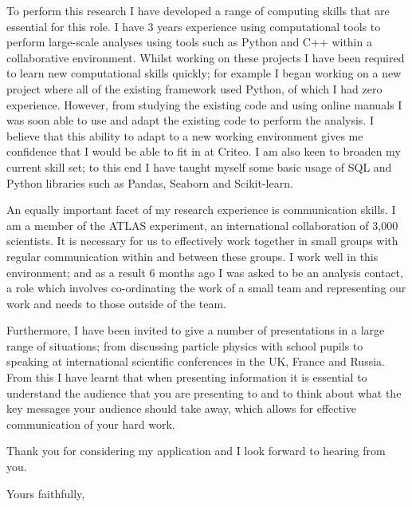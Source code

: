 \documentclass[]{letter}
\begin{document}
\begin{letter}{}
To perform this research I have developed a range of computing skills that are essential for this role.
I have 3 years experience using computational tools to perform large-scale analyses using tools such as
Python and C++ within a collaborative environment.
Whilst working on these projects I have been required to learn new computational skills quickly;
for example I began working on a new project where all of the existing framework used Python,
of which I had zero experience.
However, from studying the existing code and using online manuals
I was soon able to use and adapt the existing code to perform the analysis.
I believe that this ability to adapt to a new working environment gives me confidence that I would be able to fit in at Criteo.
I am also keen to broaden my current skill set;
to this end I have taught myself some basic usage of SQL and Python libraries such as Pandas, Seaborn and Scikit-learn.


An equally important facet of my research experience is communication skills.
I am a member of the ATLAS experiment, an international collaboration of 3,000 scientists.
It is necessary for us to effectively work together in small groups
with regular communication within and between these groups.
I work well in this environment;
and as a result 6 months ago I was asked to be an analysis contact,
a role which involves co-ordinating the work of a small team and representing our work and needs to those outside of the team.

Furthermore, I have been invited to give a number of presentations in a large range of situations;
from discussing particle physics with school pupils to speaking at international scientific conferences in the UK, France and Russia.
From this I have learnt that when presenting information it is essential to understand the audience that you are presenting to
and to think about what the key messages your audience should take away,
which allows for effective communication of your hard work.

\vspace{1mm}

Thank you for considering my application and I look forward to hearing from you.

\vspace{3mm}

\closing{Yours faithfully,}


\end{letter}
\end{document}
